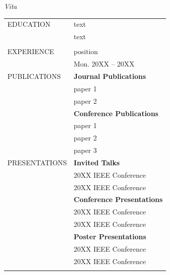 \documentclass[oneside,openany]{report}
\begin{document}
\pagebreak
% 
\noindent \fontsize{15bp}{10bp}\emph{Vita}\par
{}%
\vspace{11pt}
\begin{singlespace}
\begin{longtable}{p{} p{}} 
		EDUCATION    & text \\
		
		& text
		\\\\
		
		EXPERIENCE   & position\\ &\hfill Mon. 20XX -- 20XX \\

		
		PUBLICATIONS & \textbf{Journal Publications}\\

		& paper 1 \vspace{0.05in}\\
		& paper 2 \vspace{0.15in}\\


		& \textbf{Conference Publications}\\
		& paper 1 \vspace{0.05in}\\
		& paper 2 \vspace{0.05in}\\
		& paper 3 \vspace{0.15in}\\
		
		PRESENTATIONS
		& \textbf{Invited Talks}\\
		& 20XX IEEE Conference \vspace{0.05in}\\
		& 20XX IEEE Conference
		\vspace{0.15in}\\
		
		& \textbf{Conference Presentations}\\
		& 20XX IEEE Conference \vspace{0.05in}\\
		& 20XX IEEE Conference
		\vspace{0.15in}\\
		
		& \textbf{Poster Presentations}\\
		& 20XX IEEE Conference \vspace{0.05in}\\
		& 20XX IEEE Conference
		\vspace{0.15in}
		\\\\
		

\end{longtable}
\end{singlespace}
\end{document}
